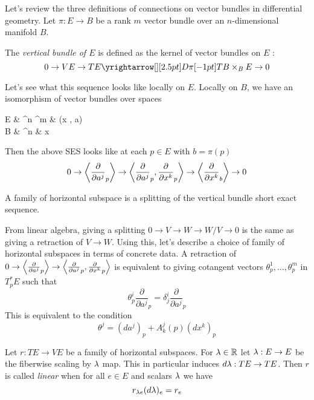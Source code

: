 \documentclass[./main.tex]{subfiles}
\begin{document}
Let's review the three definitions of connections on
vector bundles in differential geometry.
Let $\pi : E \to B$ be a rank $m$ vector bundle over an $n$-dimensional manifold $B$.

\begin{dfn}
	
  The \emph{vertical bundle of $E$} is defined as the kernel of
	vector bundles on $E$ : 
	\[
    0 \to V E \to TE \map{D\pi}{} TB \times_B E \to 0
	\]
\end{dfn}
Let's see what this sequence looks like locally on $E$.
Locally on $B$,
we have an isomorphism of vector bundles over spaces
\begin{cd}
	E & {^n \times {}^m} & {(x , a)} \\
	B & {^n} & x
	\arrow[from=1-1, to=2-1]
	\arrow["\sim", from=2-1, to=2-2]
	\arrow["x"', from=2-1, to=2-2]
	\arrow[from=1-2, to=2-2]
	\arrow["\sim"', from=1-1, to=1-2]
	\arrow["{(x , a)}", from=1-1, to=1-2]
	\arrow[maps to, from=1-3, to=2-3]
\end{cd}
Then the above SES looks like at each $p \in E$ with $b = \pi(p)$
\[
	0 \to \left\langle \frac{\partial}{\partial a^j}_p \right\rangle \to 
	\left\langle \frac{\partial}{\partial a^j}_p ,  \frac{\partial}{\partial x^k}_p\right\rangle
	\to \left\langle \frac{\partial}{\partial x^k}_b\right\rangle \to 0
\]
\begin{dfn}
	
	A family of horizontal subspace is a splitting of
	the vertical bundle short exact sequence. 
\end{dfn}
From linear algebra,
giving a splitting $0 \to V \to W \to W / V \to 0$
is the same as giving a retraction of $V \to W$.
Using this, let's describe a choice of family of horizontal subspaces in terms of
concrete data.
A retraction of $0 \to \left\langle \frac{\partial}{\partial a^j}_p \right\rangle \to 
\left\langle \frac{\partial}{\partial a^j}_p ,  \frac{\partial}{\partial x^k}_p\right\rangle$
is equivalent to giving cotangent vectors $\theta^1_p , \dots , \theta^m_p$
in $T^*_p E$ such that \[
	\theta^i_p \frac{\partial}{\partial a^j}_p = 
	\delta^i_j \frac{\partial}{\partial a^j}_p
\]
This is equivalent to the condition
\[
  \theta^j = (d a^j)_p + A^j_k(p) (d x^k)_p	
\]
\begin{dfn}
	
	Let $r : TE \to VE$ be a family of horizontal subspaces.
	For $\lambda \in \mathbb{R}$ let $\lambda : E \to E$ be the fiberwise scaling by $\lambda$ map.
	This in particular induces $d \lambda : TE \to TE$.
	Then $r$ is called \emph{linear} when for all $e \in E$ and scalars $\lambda$
	we have 
	\[
		r_{\lambda e} (d \lambda)_e = r_e 
	\]
\end{dfn}
\end{document}
